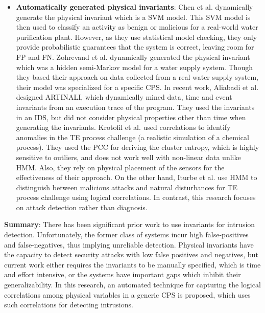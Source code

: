 \begin{itemize}
\item \textbf{Automatically generated physical invariants}: Chen et al. \cite{chen2018learning} dynamically generate the physical invariant which is a \ac{SVM} model. This \ac{SVM} model is then used to classify an activity as benign or malicious for a real-world water purification plant. However, as they use statistical model checking, they only provide probabilistic guarantees that the system is correct, leaving room for \acf{FP} and \acf{FN}. Zohrevand et al. \cite{zohrevand2016hidden} dynamically generated the physical invariant which was a hidden semi-Markov model for a water supply system. Though they based their approach on  data collected from a real water supply system, their model was specialized for a specific \ac{CPS}. In recent work, Aliabadi et al. \cite{aliabadi2017artinali} designed ARTINALI, which dynamically mined data, time and event invariants from an execution trace of the program. They used the invariants in an \ac{IDS}, but did not consider physical properties other than time when generating the invariants. Krotofil et al. \cite{krotofil2015process} used correlations to identify anomalies in the \ac{TE} process challenge (a realistic simulation of a chemical process). They used the \acf{PCC} for deriving the cluster entropy, which is highly sensitive to outliers, and does not work well with non-linear data unlike \ac{HMM}. Also, they rely on physical placement of the sensors for the effectiveness of their approach. On the other hand, Iturbe et al. \cite{iturbe2017feasibility} use \ac{HMM} to distinguish between malicious attacks and natural disturbances for \ac{TE} process challenge using logical correlations. In contrast, this research focuses on attack detection rather than diagnosis. 
\end{itemize}

\textbf{Summary}: There has been significant prior work to use invariants for intrusion detection. Unfortunately, the former class of systems incur high false-positives and false-negatives, thus implying unreliable detection. Physical invariants have the capacity to detect security attacks with low false positives and negatives, but current work either requires the invariants to be manually specified, which is time and effort intensive, or the systems have important gaps which inhibit their generalizability. In this research, an automated technique for capturing the logical correlations among physical variables in a generic \ac{CPS} is proposed, which uses such correlations for detecting intrusions.

\endinput
